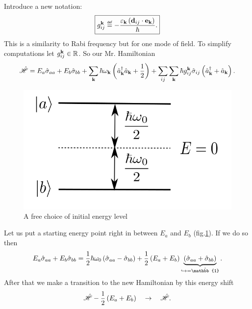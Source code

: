 Introduce a new notation:
\begin{equation}
	\boxed{	g_{ij}^{\kv} \myeq - \frac{ \varepsilon_{\kv} \left(\vec{d}_{ij} \cdot  \vec{e}_{\kv}\right)}{\hbar}.}
\end{equation}
This is a similarity to Rabi frequency but for one mode of field. To simplify computations let $g^{\mathbf{k}}_{ij} \in \mathbb{R}$. So our Mr. Hamiltonian
\begin{equation}
	\hat{\mathscr{H}} = E_a \hat{\sigma}_{aa} + E_b \hat{\sigma}_{bb} + \sum_{\mathbf{k}} \hbar \omega_{\mathbf{k}} \left( \hat{a}^{\dagger}_{\mathbf{k}} \hat{a}_{\mathbf{k}} + \frac{1}{2} \right) + \sum_{ij} \sum_{\mathbf{k}} \hbar g_{ij}^{\mathbf{k}} \hat{\sigma}_{ij} \left( \hat{a}^{\dagger}_{\mathbf{k}} +  \hat{a}_{\mathbf{k}} \right).
\end{equation}
\begin{figure}
	\centering
	\includegraphics[width=0.4\linewidth]{fig/L6/E00000}
	\caption{A free choice of initial energy level}
	\label{fig:e00000}
\end{figure}
Let us put a starting energy point right in between $E_a$ and $E_b$ (fig.\ref{fig:e00000}). If we do so then
\begin{equation}
	E_a \hat{\sigma}_{aa} + E_b \hat{\sigma}_{bb} = \half \hbar \omega_0 \left( \hat{\sigma}_{aa} - \hat{\sigma}_{bb} \right) + \half \left( E_a + E_b \right)\underbrace{\left( \hat{\sigma}_{aa} + \hat{\sigma}_{bb} \right)}_{\hookrightarrow = \hat{\mathbb{1}}}.
\end{equation}
After that we make a transition to the new Hamiltonian by this energy shift
\begin{equation}
	\hat{\mathscr{H}} - \frac{1}{2} \left( E_a + E_b \right) \quad \to \quad \hat{\mathscr{H}}.
\end{equation}

